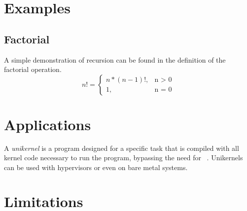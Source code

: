 \section{Examples}\label{se:cfg_examples}
\subsection{Factorial}
A simple demonstration of recursion can be found in the definition of the factorial operation.
\begin{equation}
  n!=\begin{cases}
    n * (n - 1)!, & \text{n > 0} \\
    1, & \text{n = 0}
  \end{cases}
\end{equation}

\section{Applications}\label{se:cfg_applications}
A \emph{unikernel} is a program designed for a specific task
that is compiled with all kernel code necessary to run the program,
bypassing the need for ~\citep{madhavapeddy2014unikernels}.
Unikernels can be used with hypervisors or even on bare metal systems.

\section{Limitations}
